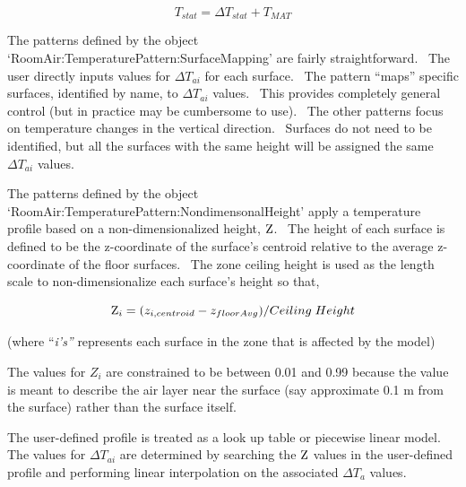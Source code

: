 \begin{equation}
{T_{stat}} = \Delta {T_{stat}} + {T_{MAT}}
\end{equation}

The patterns defined by the object `RoomAir:TemperaturePattern:SurfaceMapping' are fairly straightforward.~ The user directly inputs values for \(\Delta {T_{ai}}\) for each surface.~ The pattern ``maps'' specific surfaces, identified by name, to \(\Delta {T_{ai}}\) values.~ This provides completely general control (but in practice may be cumbersome to use).~ The other patterns focus on temperature changes in the vertical direction.~ Surfaces do not need to be identified, but all the surfaces with the same height will be assigned the same \(\Delta {T_{ai}}\) values.

The patterns defined by the object `RoomAir:TemperaturePattern:NondimensonalHeight' apply a temperature profile based on a non-dimensionalized height, \({\rm Z}\).~ The height of each surface is defined to be the z-coordinate of the surface's centroid relative to the average z-coordinate of the floor surfaces.~ The zone ceiling height is used as the length scale to non-dimensionalize each surface's height so that,

\begin{equation}
{{\rm Z}_i} = ({z_{i,centroid}} - {z_{floorAvg}})/Ceiling\;Height
\end{equation}

(where ``\emph{i's''} represents each surface in the zone that is affected by the model)

The values for \({Z_i}\) are constrained to be between 0.01 and 0.99 because the value is meant to describe the air layer near the surface (say approximate 0.1 m from the surface) rather than the surface itself.

The user-defined profile is treated as a look up table or piecewise linear model.~ The values for \(\Delta {T_{ai}}\) are determined by searching the \({\rm Z}\) values in the user-defined profile and performing linear interpolation on the associated \(\Delta {T_a}\) values.

